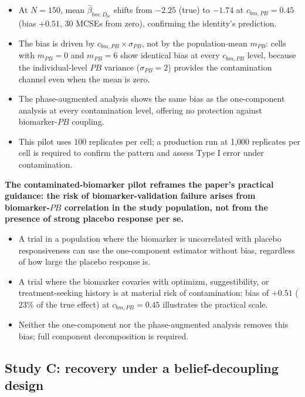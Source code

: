 \documentclass[
  11pt,
]{article}
\begin{document}
\begin{itemize}\setlength{\itemsep}{2pt}\setlength{\parskip}{0pt}
\item At $N=150$, mean $\hat\beta_{bm:D_{bc}}$ shifts from
  $-2.25$ (true) to $-1.74$ at $c_{bm,PB}=0.45$ (bias $+0.51$,
  30 MCSEs from zero), confirming the identity's
  prediction.
\item The bias is driven by $c_{bm,PB} \times \sigma_{PB}$, not
  by the population-mean $m_{PB}$: cells with $m_{PB}=0$ and
  $m_{PB}=6$ show identical bias at every $c_{bm,PB}$ level,
  because the individual-level $PB$ variance ($\sigma_{PB}=2$)
  provides the contamination channel even when the mean is zero.
\item The phase-augmented analysis shows the same bias as the
  one-component analysis at every contamination level, offering
  no protection against biomarker-$PB$ coupling.
\item This pilot uses 100 replicates per cell; a production run
  at 1,000 replicates per cell is required to confirm the pattern
  and assess Type I error under contamination.
\end{itemize}

\textbf{The contaminated-biomarker pilot reframes the paper's
practical guidance: the risk of biomarker-validation failure
arises from biomarker-$PB$ correlation in the study population,
not from the presence of strong placebo response per se.}

\begin{itemize}\setlength{\itemsep}{2pt}\setlength{\parskip}{0pt}
\item A trial in a population where the biomarker is uncorrelated
  with placebo responsiveness can use the one-component estimator
  without bias, regardless of how large the placebo response is.
\item A trial where the biomarker covaries with optimizm,
  suggestibility, or treatment-seeking history is at material
  risk of contamination; bias of $+0.51$ ($23\%$ of the true
  effect) at $c_{bm,PB}=0.45$ illustrates the practical scale.
\item Neither the one-component nor the phase-augmented analysis
  removes this bias; full component decomposition is required.
\end{itemize}

\subsection{Study C: recovery under a belief-decoupling design}\label{study-c-recovery-under-a-belief-decoupling-design}
\end{document}
